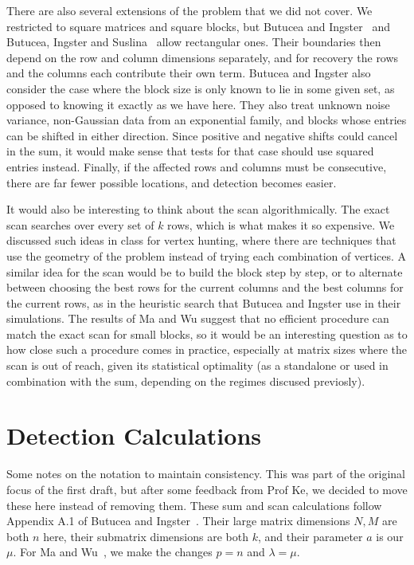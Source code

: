\documentclass[12pt]{article}
\begin{document}
There are also several extensions of the problem that we did not
cover. We restricted to square matrices and square blocks, but
Butucea and Ingster~\cite{BI2013} and Butucea, Ingster and
Suslina~\cite{BIS2015} allow rectangular ones. Their boundaries then
depend on the row and column dimensions separately, and for recovery
the rows and the columns each contribute their own term. Butucea and
Ingster also consider the case where the block size is only known to
lie in some given set, as opposed to knowing it exactly as we have here. They also treat unknown noise variance,
non-Gaussian data from an exponential family, and blocks whose entries
can be shifted in either direction. Since positive and negative shifts
could cancel in the sum, it would make sense that tests for that case should use squared entries
instead. Finally, if the affected rows and columns must be consecutive,
there are far fewer possible locations, and detection becomes easier.

It would also be interesting to think about the scan algorithmically.
The exact scan searches over every set of $k$ rows, which is what
makes it so expensive. We discussed such ideas in class for vertex hunting, where there are techniques that use the geometry of the problem instead of trying each combination of vertices. A
similar idea for the scan would be to build the block step by step, or
to alternate between choosing the best rows for the current columns
and the best columns for the current rows, as in the heuristic search
that Butucea and Ingster use in their simulations. The results of Ma
and Wu suggest that no efficient procedure can match the exact scan for
small blocks, so it would be an interesting question as to how close such a
procedure comes in practice, especially at matrix sizes where the scan is out of reach, given its statistical optimality (as a standalone or used in combination with the sum, depending on the regimes discused previosly).
\clearpage
\appendix
\section{Detection Calculations}

Some notes on the notation to maintain consistency. This was part of the original focus of the first draft, but after some feedback from Prof Ke, we decided to move these here instead of removing them. These sum and scan calculations follow Appendix A.1 of Butucea and
Ingster~\cite{BI2013}. Their large matrix dimensions $N,M$ are both
$n$ here, their submatrix dimensions are both $k$, and their parameter
$a$ is our $\mu$. For Ma and Wu~\cite{MW2015}, we make the changes $p=n$ and $\lambda=\mu$.
\end{document}
